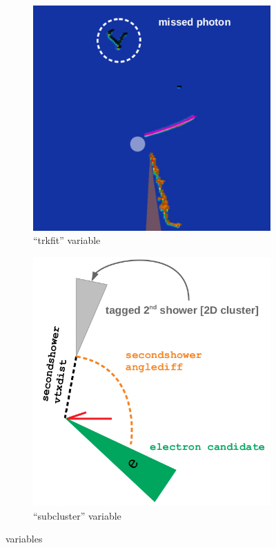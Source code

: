 \begin{figure}[H] 
\begin{center}
    \begin{subfigure}[b]{0.35\textwidth}
    \centering
    \includegraphics[width=1.00\textwidth]{nueselection/variables/secondshowerevd.png}
    \caption{\label{fig:nue:variables:secondshowerevd} ``trkfit'' variable }
    \end{subfigure}
    \begin{subfigure}[b]{0.35\textwidth}
    \centering
    \includegraphics[width=1.00\textwidth]{nueselection/variables/secondshower.png}
    \caption{\label{fig:nue:variables:secondshower} ``subcluster'' variable }
    \end{subfigure}
\caption{\label{fig:nue:variables:secondshower} variables}
\end{center}
\end{figure}

